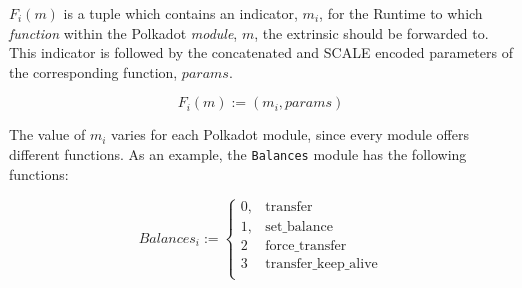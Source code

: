 \begin{definition}
    \label{defn-function-indicator}
    $F_i(m)$ is a tuple which contains an indicator, $m_i$, for the Runtime to
    which \textit{function} within the Polkadot \textit{module}, $m$, the
    extrinsic should be forwarded to. This indicator is followed by the
    concatenated and SCALE encoded parameters of the corresponding function,
    $params$.

    \[
        F_i(m) := (m_i, params)
    \]

    The value of $m_i$ varies for each Polkadot module, since every module
    offers different functions. As an example, the \verb|Balances| module has
    the following functions:

    \[
        Balances_i :=
        \begin{cases}
        0, & \text{transfer} \\
        1, & \text{set\_balance} \\
        2 & \text{force\_transfer} \\
        3 & \text{transfer\_keep\_alive} \\
        \end{cases}
    \]
\end{definition}
